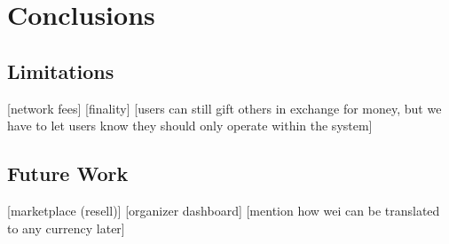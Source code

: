 \chapter{Conclusions}
\label{chap:conclusions}

\section{Limitations}
 [network fees]
 [finality]
 [users can still gift others in exchange for money, but we have to let users know they should only operate within the system]

\section{Future Work}

 [marketplace (resell)]
 [organizer dashboard]
 [mention how wei can be translated to any currency later]